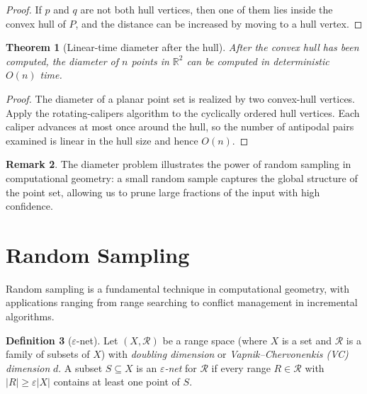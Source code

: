 \documentclass[twoside,12pt]{book}
\theoremstyle{plain}
\newtheorem{theorem}{Theorem}[chapter]
\theoremstyle{definition}
\newtheorem{definition}[theorem]{Definition}
\newtheorem{remark}[theorem]{Remark}
\theoremstyle{remark}
\begin{document}
\begin{proof}
If $p$ and $q$ are not both hull vertices, then one of them lies inside the convex hull of $P$, and the distance can be increased by moving to a hull vertex.
\end{proof}

\begin{theorem}[Linear-time diameter after the hull]
\label{thm:diameter-rand}
After the convex hull has been computed, the diameter of $n$ points in
$\mathbb{R}^2$ can be computed in deterministic $O(n)$ time.
\end{theorem}

\begin{proof}
The diameter of a planar point set is realized by two convex-hull vertices.
Apply the rotating-calipers algorithm to the cyclically ordered hull vertices.
Each caliper advances at most once around the hull, so the number of
antipodal pairs examined is linear in the hull size and hence $O(n)$.
\end{proof}

\begin{remark}
The diameter problem illustrates the power of random sampling in computational geometry: a small random sample captures the global structure of the point set, allowing us to prune large fractions of the input with high confidence.
\end{remark}

\section{Random Sampling}
\label{sec:sampling}

Random sampling is a fundamental technique in computational geometry, with applications ranging from range searching to conflict management in incremental algorithms.

\begin{definition}[$\varepsilon$-net]
Let $(X, \mathcal{R})$ be a range space (where $X$ is a set and $\mathcal{R}$ is a family of subsets of $X$) with \emph{doubling dimension} or \emph{Vapnik--Chervonenkis (VC) dimension} $d$. A subset $S \subseteq X$ is an \emph{$\varepsilon$-net} for $\mathcal{R}$ if every range $R \in \mathcal{R}$ with $|R| \geq \varepsilon |X|$ contains at least one point of $S$.
\end{definition}
\end{document}
